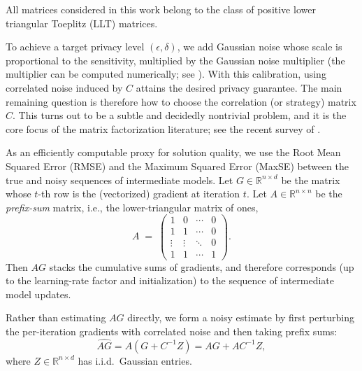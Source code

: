 \documentclass{article}
\theoremstyle{plain}
\theoremstyle{definition}
\theoremstyle{remark}
\begin{document}
All matrices considered in this work belong to the class of positive lower triangular Toeplitz (LLT) matrices.

To achieve a target privacy level $(\epsilon,\delta)$, we add Gaussian noise whose scale
is proportional to the sensitivity, multiplied by the Gaussian noise multiplier (the
multiplier can be computed numerically; see \citet{balle2018improving}). With this
calibration, using correlated noise induced by $C$ attains the desired privacy
guarantee. The main remaining question is therefore how to choose the correlation (or
strategy) matrix $C$. This turns out to be a subtle and decidedly nontrivial problem,
and it is the core focus of the matrix factorization literature; see the recent survey
of \citet{pillutla2025correlated}.

As an efficiently computable proxy for solution quality, we use the Root Mean Squared
Error (RMSE) and the Maximum Squared Error (MaxSE) between the true and noisy sequences
of intermediate models.
Let $G \in \mathbb{R}^{n \times d}$ be the matrix whose $t$-th row is the (vectorized)
gradient at iteration $t$. Let $A \in \mathbb{R}^{n \times n}$ be the \emph{prefix-sum}
matrix, i.e., the lower-triangular matrix of ones,
\begin{equation}
A \;=\;
\begin{pmatrix}
1      & 0            & \cdots & 0 \\
1      & 1            & \cdots & 0 \\
\vdots & \vdots  & \ddots & 0 \\
1      & 1      &\cdots      & 1
\end{pmatrix}.
\end{equation}
Then $AG$ stacks the cumulative sums of gradients, and therefore corresponds (up to the
learning-rate factor and initialization) to the sequence of intermediate model updates.

Rather than estimating $AG$ directly, we form a noisy estimate by first perturbing the
per-iteration gradients with correlated noise and then taking prefix sums:
\begin{equation}
    \widehat{AG} = A(G + C^{-1}Z) = AG + AC^{-1}Z,
\end{equation}
where $Z \in \mathbb{R}^{n \times d}$ has i.i.d.\ Gaussian entries.
\end{document}
